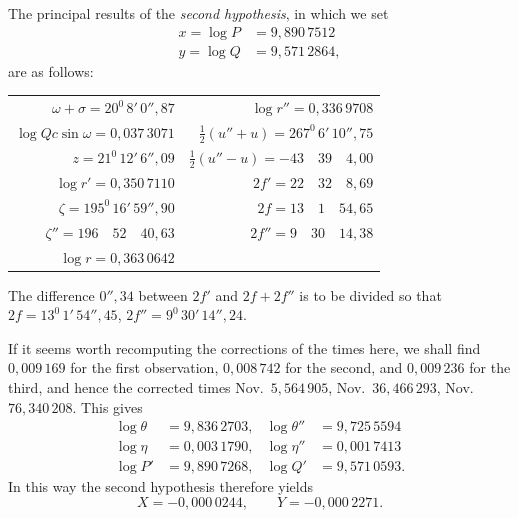 The principal results of the \textit{second hypothesis}, in which we set
\[
\begin{aligned}
x=\log P&=9{,}890\,7512\\
y=\log Q&=9{,}571\,2864,
\end{aligned}
\]
\noindent are as follows:
\begin{center}\begingroup\footnotesize\setlength{\tabcolsep}{6pt}\renewcommand{\arraystretch}{1.3}
\begin{tabular}{r|r}
$\omega+\sigma=20^0\,8'\,0''{,}87$ & $\log r''=0{,}336\,9708$\\
$\log Qc\sin\omega=0{,}037\,3071$ & $\tfrac12(u''+u)=267^0\,6'\,10''{,}75$\\
$z=21^0\,12'\,6''{,}09$ & $\tfrac12(u''-u)=-43\quad39\quad4{,}00$\\
$\log r'=0{,}350\,7110$ & $2f'=22\quad32\quad8{,}69$\\
$\zeta=195^0\,16'\,59''{,}90$ & $2f=13\quad1\quad54{,}65$\\
$\zeta''=196\quad52\quad40{,}63$ & $2f''=9\quad30\quad14{,}38$\\
$\log r=0{,}363\,0642$ &
\end{tabular}\endgroup\end{center}
\noindent The difference $0''{,}34$ between $2f'$ and $2f+2f''$ is to be divided so that $2f=13^0\,1'\,54''{,}45$, $2f''=9^0\,30'\,14''{,}24$.

If it seems worth recomputing the corrections of the times here, we shall find $0{,}009\,169$ for the first observation, $0{,}008\,742$ for the second, and $0{,}009\,236$ for the third, and hence the corrected times Nov.\ $5{,}564\,905$, Nov.\ $36{,}466\,293$, Nov.\ $76{,}340\,208$. This gives
\[
\begin{aligned}
\log\theta&=9{,}836\,2703,&\log\theta''&=9{,}725\,5594\\
\log\eta&=0{,}003\,1790,&\log\eta''&=0{,}001\,7413\\
\log P'&=9{,}890\,7268,&\log Q'&=9{,}571\,0593.
\end{aligned}
\]
\noindent In this way the second hypothesis therefore yields
\[X=-0{,}000\,0244,\qquad Y=-0{,}000\,2271.\]

